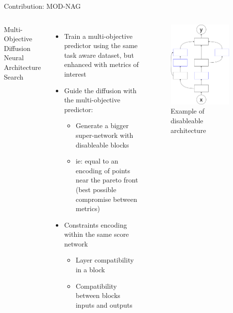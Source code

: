 \documentclass[aspectratio=169,xcolor=dvipsnames]{beamer}
\begin{document}
\begin{frame}{Contribution: MOD-NAG}
    \begin{columns}[c]
        Multi-Objective Diffusion Neural Architecture Search
        \begin{itemize}
            \item Train a multi-objective predictor using the same task aware dataset, but enhanced with metrics of interest
            \item Guide the diffusion with the multi-objective predictor:
                  \begin{itemize}
                      \item Generate a bigger super-network with disableable blocks
                      \item ie: equal to an encoding of points near the pareto front (best possible compromise between metrics)
                  \end{itemize}
            \item Constraints encoding within the same score network
                  \begin{itemize}
                      \item Layer compatibility in a block
                      \item Compatibility between blocks inputs and outputs
                  \end{itemize}
        \end{itemize}

        \begin{figure}[htbp]
            \centering
            \includegraphics[width=.7\textwidth]{diagram.drawio.png}
            \caption{Example of disableable architecture}
        \end{figure}
    \end{columns}
\end{frame}
\end{document}
